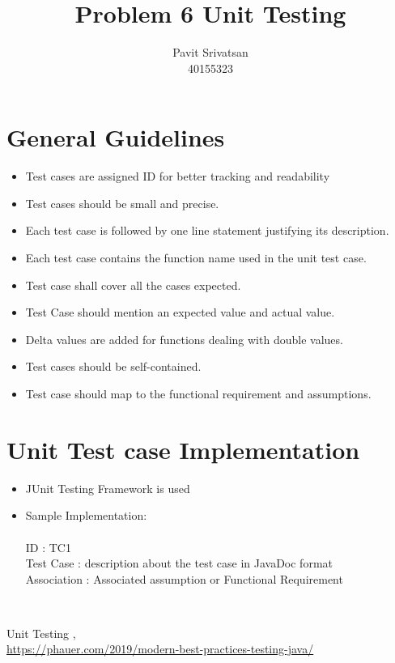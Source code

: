 \documentclass[a4paper,12pt]{article}
\title{Problem 6 Unit Testing}
\author{Pavit Srivatsan \\ 40155323}
\date{}
\begin{document}
\maketitle
\section{General Guidelines}

\begin{itemize}
    \item Test cases are assigned ID for better tracking and readability 
    \item Test cases should be small and precise.
    \item Each test case is followed by one line statement justifying its description.
    \item Each test case contains the function name used in the unit test case.
    \item Test case shall cover all the cases expected.
    \item Test Case should mention an expected value and actual value.
    \item Delta values are added for functions dealing with double values.
    \item Test cases should be self-contained.
    \item Test case should map to the functional requirement and assumptions.
\end{itemize}

\section{Unit Test case Implementation}
\begin{itemize}
    \item JUnit Testing Framework is used
    \item Sample Implementation:\\
    \\ID : TC1
 \\Test  Case :  description about the test case in JavaDoc format
 \\Association : Associated assumption or Functional Requirement
\end{itemize}
   
 
 \
\begin{thebibliography}{9}
Unit Testing ,\\
\url{https://phauer.com/2019/modern-best-practices-testing-java/}
\end{thebibliography}
\end{document}
